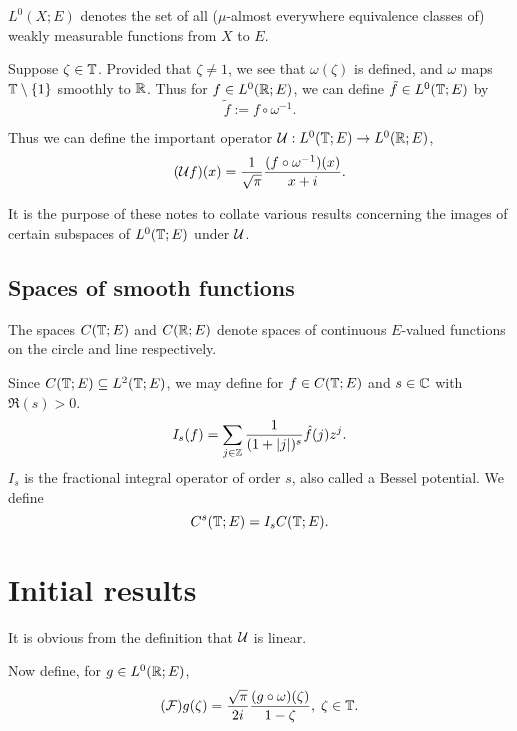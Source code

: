 \documentclass{unswmaths}
\begin{document}
$L^0(X;E)$ denotes the set of all ($\mu$-almost everywhere equivalence classes of)
weakly measurable functions from $X$ to $E$.

Suppose $\zeta \in \mathbb{T}$. Provided that $\zeta \neq 1$, we see that $\omega(\zeta)$
is defined, and $\omega$ maps $\mathbb{T}\setminus\{1\}$ smoothly to $\mathbb{R}$. Thus for
$f \in L^0(\mathbb{R};E)$, we can define $\tilde{f} \in L^0(\mathbb{T};E)$
by 
\begin{equation*}
    \tilde{f} := f\circ \omega^{-1}.
\end{equation*}

Thus we can define the important operator $\mathcal{U}:L^0(\mathbb{T};E)\rightarrow L^0(\mathbb{R};E)$,
\begin{equation*}
    (\mathcal{U} f)(x) = \frac{1}{\sqrt{\pi}}\frac{(f\circ \omega^{-1})(x)}{x+i}.
\end{equation*}

It is the purpose of these notes to collate various results concerning the images
of certain subspaces of $L^0(\mathbb{T};E)$ under $\mathcal{U}$.


\subsection*{Spaces of smooth functions}
The spaces $C(\mathbb{T};E)$ and $C(\mathbb{R};E)$ denote spaces of continuous $E$-valued functions on
the circle and line respectively.

Since $C(\mathbb{T};E) \subseteq L^2(\mathbb{T};E)$, we may define for $f \in C(\mathbb{T};E)$
and $s \in \mathbb{C}$ with $\Re(s) > 0$. 
\begin{equation*}
    I_s(f) = \sum_{j \in \mathbb{Z}} \frac{1}{(1+|j|)^s}\hat{f}(j)z^j.
\end{equation*}
$I_s$ is the fractional integral operator of order $s$, also called a Bessel potential.
We define
\begin{equation*}
    C^s(\mathbb{T};E) = I_sC(\mathbb{T};E).
\end{equation*}


\section*{Initial results}
It is obvious from the definition that $\mathcal{U}$ is linear. 

Now define, for $g \in L^0(\mathbb{R};E)$,
\begin{equation*}
    (\mathcal{F})g(\zeta) = \frac{\sqrt{\pi}}{2i}\frac{(g\circ \omega)(\zeta)}{1-\zeta},\;\zeta\in\mathbb{T}.
\end{equation*}
\end{document}
